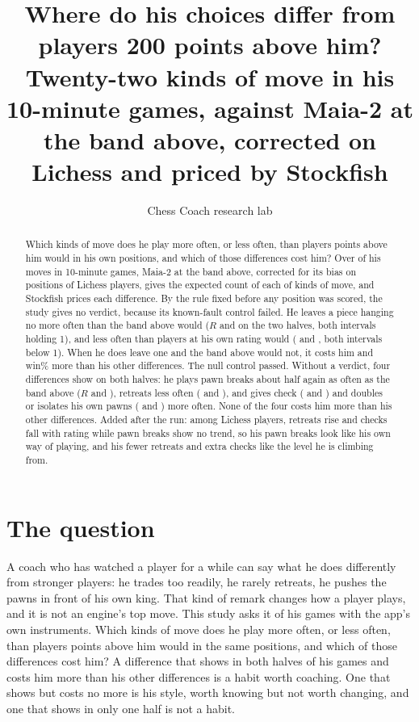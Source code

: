 \documentclass[11pt]{article}
\title{Where do his choices differ from players 200 points above him?\\[0.3em]
\large Twenty-two kinds of move in his 10-minute games, against Maia-2 at the band above,
corrected on Lichess and priced by Stockfish}
\author{Chess Coach research lab}
\date{}
\begin{document}
\maketitle

\begin{abstract}
Which kinds of move does he play more often, or less often, than players \Above{} points above
him would in his own positions, and which of those differences cost him? Over \Positions{} of his
moves in \Games{} 10-minute games, Maia-2 at the band above, corrected for its bias on
\LichessPositions{} positions of Lichess players, gives the expected count of each of \Kinds{}
kinds of move, and Stockfish prices each difference. By the rule fixed before any position was
scored, the study gives no verdict, because its known-fault control failed. He leaves a piece
hanging no more often than the band above would ($R$ \HangsRFirst{} and \HangsRSecond{} on the two
halves, both intervals holding 1), and less often than players at his own rating would
(\HangsRhisFirst{} and \HangsRhisSecond, both intervals below 1). When he does leave one and the
band above would not, it costs him \HangsRelFirst{} and \HangsRelSecond{} win\% more than his
other differences. The null control passed. Without a verdict, four differences show on both
halves: he plays pawn breaks about half again as often as the band above ($R$ \BreakRFirst{} and
\BreakRSecond), retreats less often (\RetreatRFirst{} and \RetreatRSecond), and gives check
(\CheckRFirst{} and \CheckRSecond) and doubles or isolates his own pawns (\WeakRFirst{} and
\WeakRSecond) more often. None of the four costs him more than his other differences. Added after
the run: among Lichess players, retreats rise and checks fall with rating while pawn breaks show
no trend, so his pawn breaks look like his own way of playing, and his fewer retreats and extra
checks like the level he is climbing from.
\end{abstract}

\section{The question}

A coach who has watched a player for a while can say what he does differently from stronger
players: he trades too readily, he rarely retreats, he pushes the pawns in front of his own king.
That kind of remark changes how a player plays, and it is not an engine's top move. This study
asks it of his games with the app's own instruments. Which kinds of move does he play more often,
or less often, than players \Above{} points above him would in the same positions, and which of
those differences cost him? A difference that shows in both halves of his games and costs him
more than his other differences is a habit worth coaching. One that shows but costs no more is
his style, worth knowing but not worth changing, and one that shows in only one half is not a
habit.
\end{document}
